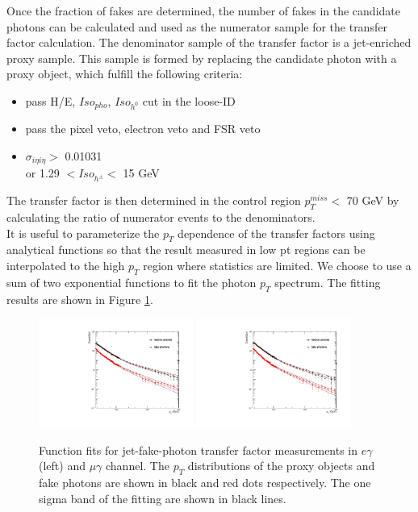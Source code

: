 \documentclass[thesis.tex]{subfiles}
\renewcommand\_{\textunderscore\allowbreak}
\begin{document}
Once the fraction of fakes are determined, the number of fakes in the candidate photons can be calculated and used as the numerator sample for the transfer factor calculation. The denominator sample of the transfer factor is a jet-enriched proxy sample. This sample is formed by replacing the candidate photon with a proxy object, which fulfill the following  criteria:
\begin{center}
\begin{itemize}
\item pass H/E, $Iso_{pho}$, $Iso_{h^0}$ cut in the loose-ID
\item pass the pixel veto, electron veto and FSR veto
\item $\sigma_{i\eta i\eta} >$ 0.01031 \\
     or   1.29 $< Iso_{h^\pm} <$ 15 GeV
\end{itemize}
\end{center}

The transfer factor is then determined in the control region $p_{T}^{miss} <$ 70 GeV by calculating the ratio of numerator events to the denominators.\\

It is useful to parameterize the $p_T$ dependence of the transfer factors using analytical functions so that the result measured in low pt regions can be interpolated to the high $p_T$ region where statistics are limited. We choose to use a sum of two exponential functions to fit the photon $p_T$ spectrum. The fitting results are shown in Figure \ref{fig:jetFakePt}.

\begin{figure}
  \centering
    \includegraphics[width=0.45\textwidth]{Figures/JetFakeRate_transfer_eg_EB.pdf}
    \includegraphics[width=0.45\textwidth]{Figures/JetFakeRate_transfer_mg_EB.pdf}
  \caption{Function fits for jet-fake-photon transfer factor measurements in $e\gamma$ (left) and $\mu\gamma$ channel. The $p_T$ distributions of the proxy objects and fake photons are shown in black and red dots respectively. The one sigma band of the fitting are shown in black lines.}
    \label{fig:jetFakePt}
\end{figure}
\end{document}
